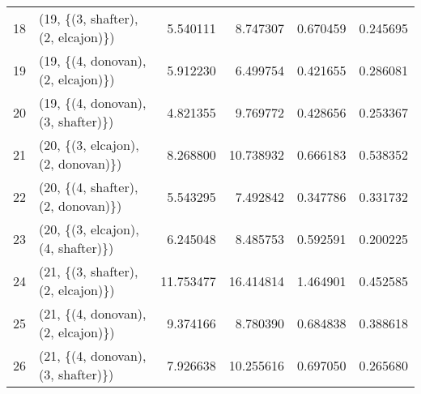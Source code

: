 \begin{tabular}{llrrrr}
18 &  (19, \{(3, shafter), (2, elcajon)\}) &   5.540111 &   8.747307 &   0.670459 &  0.245695 \\
19 &  (19, \{(4, donovan), (2, elcajon)\}) &   5.912230 &   6.499754 &   0.421655 &  0.286081 \\
20 &  (19, \{(4, donovan), (3, shafter)\}) &   4.821355 &   9.769772 &   0.428656 &  0.253367 \\
21 &  (20, \{(3, elcajon), (2, donovan)\}) &   8.268800 &  10.738932 &   0.666183 &  0.538352 \\
22 &  (20, \{(4, shafter), (2, donovan)\}) &   5.543295 &   7.492842 &   0.347786 &  0.331732 \\
23 &  (20, \{(3, elcajon), (4, shafter)\}) &   6.245048 &   8.485753 &   0.592591 &  0.200225 \\
24 &  (21, \{(3, shafter), (2, elcajon)\}) &  11.753477 &  16.414814 &   1.464901 &  0.452585 \\
25 &  (21, \{(4, donovan), (2, elcajon)\}) &   9.374166 &   8.780390 &   0.684838 &  0.388618 \\
26 &  (21, \{(4, donovan), (3, shafter)\}) &   7.926638 &  10.255616 &   0.697050 &  0.265680 \\
\bottomrule
\end{tabular}

